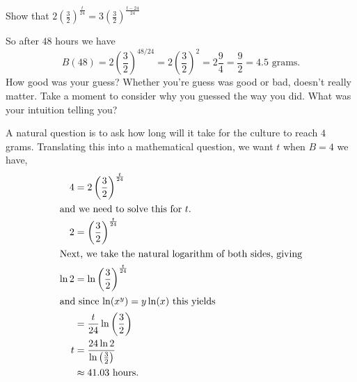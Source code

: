 \begin{myexample}
  \begin{ProficiencyDrill}
    Show that $2\left(\frac32\right)^{\frac{t}{24}} =
    3\left(\frac32\right)^{\frac{t-24}{24}}$
  \end{ProficiencyDrill}
  So after $48$ hours we have
  $$
  B(48)=2\left(\frac{3}{2}\right)^{48/24}=2\left(\frac{3}{2}\right)^2=2\frac{9}{4}=\frac{9}{2}=4.5
  \text{ grams}.
  $$
  How  good was your guess?  Whether you're guess was good or bad,
  doesn't really matter. Take a moment to consider why you guessed the
  way you did. What was your intuition telling you?

  A natural question is to ask how long will it take for the culture
  to reach $4$ grams.  Translating this into a mathematical question,
  we want $t$ when $B=4$ we have,
  \begin{align*}
    4&=2\left(\frac{3}{2}\right)^{\frac{t}{24}}\\
    \intertext{and we need to solve this for $t.$}
    2&=\left(\frac{3}{2}\right)^{\frac{t}{24}}\\
    \intertext{Next, we take the natural logarithm
    of both sides, giving}
    \ln 2&=\ln \left(\frac{3}{2}\right)^{\frac{t}{24}}  \\
    \intertext{and since $\ln(x^y)=y\ln(x)$ this yields}
     &=\frac{t}{24} \ln \left(\frac{3}{2}\right) \\
    t&=\frac{24  \ln 2}{\ln \left(\frac{3}{2}\right)}\\
     &\approx 41.03 \text{ hours.}
  \end{align*}

\end{myexample}





